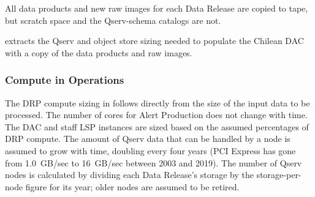 All data products and new raw images for each Data Release are copied to tape, but scratch space and the Qserv-schema catalogs are not.

 extracts the Qserv and object store sizing needed to populate the Chilean DAC with a copy of the data products and raw images.

\subsubsection{Compute in Operations}

The DRP compute sizing in  follows directly from the size of the input data to be processed.
The number of cores for Alert Production does not change with time.
The DAC and staff LSP instances are sized based on the assumed percentages of DRP compute.
The amount of Qserv data that can be handled by a node is assumed to grow with time, doubling every four years (PCI Express has gone from 1.0~GB/sec to 16~GB/sec between 2003 and 2019).
The number of Qserv nodes is calculated by dividing each Data Release's storage by the storage-per-node figure for its year; older nodes are assumed to be retired.
